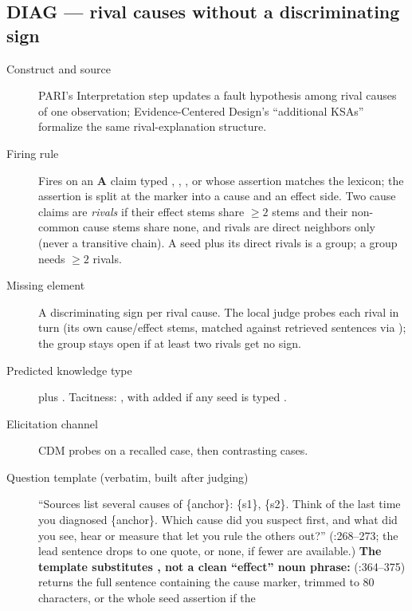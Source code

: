 \subsection{DIAG --- rival causes without a discriminating sign}

\begin{description}
  \item[Construct and source] PARI's Interpretation step updates a fault hypothesis among rival
    causes of one observation; Evidence-Centered Design's \enquote{additional KSAs} formalize the
    same rival-explanation structure.
  \item[Firing rule] Fires on an \textbf{A} claim typed , ,
    ,  or  whose assertion
    matches the  lexicon; the assertion is split at the marker into a cause and an
    effect side. Two cause claims are \emph{rivals} if their effect stems share $\geq 2$ stems and
    their non-common cause stems share none, and rivals are direct neighbors only (never a
    transitive chain). A seed plus its direct rivals is a group; a group needs $\geq 2$ rivals.
  \item[Missing element] A discriminating sign per rival cause. The local judge probes each rival
    in turn (its own cause/effect stems, matched against retrieved sentences via );
    the group stays open if at least two rivals get no sign.
  \item[Predicted knowledge type]  plus . Tacitness:
    , with  added if any seed is typed .
  \item[Elicitation channel] CDM probes on a recalled case, then contrasting cases.
  \item[Question template (verbatim, built after judging)] \enquote{Sources list several causes of
    \{anchor\}: \textquotedbl\{s1\}\textquotedbl, \textquotedbl\{s2\}\textquotedbl. Think of the
    last time you diagnosed \{anchor\}. Which cause did you suspect first, and what did you see,
    hear or measure that let you rule the others out?} (:268--273;
    the lead sentence drops to one quote, or none, if fewer are available.) \textbf{The template
    substitutes , not a clean \enquote{effect} noun phrase:}
     (:364--375) returns the full sentence
    containing the cause marker, trimmed to 80 characters, or the whole seed assertion if the

\end{description}
